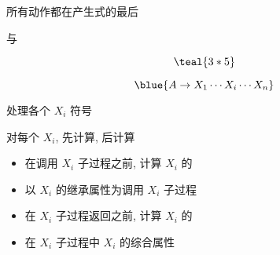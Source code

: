 \begin{frame}{}
  \begin{center}
    \begin{columns}
        \begin{center}
        \end{center}
        \begin{center}
        \end{center}
    \end{columns}

    \vspace{0.80cm}
     所有动作都在产生式的最后
  \end{center}
\end{frame}

\begin{frame}{}
  \begin{center}
     与 

    \vspace{0.30cm}
    \vspace{-0.20cm}
    \[
      \teal{3 \ast 5}
    \]

    \pause
    \vspace{-0.50cm}
    \[
      \blue{A \to X_{1} \cdots X_{i} \cdots X_{n}}
    \]

     处理各个 $X_{i}$ 符号

    \vspace{0.10cm}
    对每个 $X_{i}$, 先计算, 后计算
  \end{center}
\end{frame}

\begin{frame}{}
  \begin{center}

    \vspace{0.80cm}
    \begin{itemize}
      \centering
      \setlength{\itemsep}{15pt}
      \item 在调用 $X_{i}$ 子过程之前, 计算 $X_{i}$ 的
      \item 以 $X_{i}$ 的继承属性为调用 $X_{i}$ 子过程
      \item 在 $X_{i}$ 子过程返回之前, 计算 $X_{i}$ 的
      \item 在 $X_{i}$ 子过程中 $X_{i}$ 的综合属性
    \end{itemize}
  \end{center}
\end{frame}

